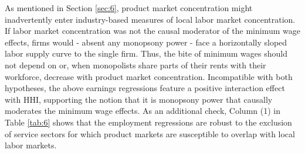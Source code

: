 \documentclass[11pt,oneside,reqno,xcolor=dvipsnames]{article} %
\begin{document}
As mentioned in Section \ref{sec:6}, product market concentration might inadvertently enter industry-based measures of local labor market concentration. If labor market concentration was not the causal moderator of the minimum wage effects, firms would - absent any monopsony power - face a horizontally sloped labor supply curve to the single firm. Thus, the bite of minimum wages should not depend on or, when monopolists share parts of their rents with their workforce, decrease with product market concentration. Incompatible with both hypotheses, the above earnings regressions feature a positive interaction effect with HHI, supporting the notion that it is monopsony power that causally moderates the minimum wage effects. As an additional check, Column (1) in Table \ref{tab:6} shows that the employment regressions are robust to the exclusion of service sectors for which product markets are susceptible to overlap with local labor markets.
\end{document}
